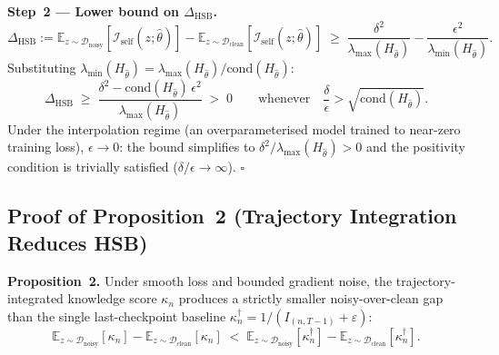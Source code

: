 \textbf{Step~2 --- Lower bound on $\Delta_\text{HSB}$.}
\begin{equation}
    \Delta_\text{HSB}
    := \mathbb{E}_{z \sim \mathcal{D}_\text{noisy}}[\mathcal{I}_\text{self}(z;\hat\theta)]
     - \mathbb{E}_{z \sim \mathcal{D}_\text{clean}}[\mathcal{I}_\text{self}(z;\hat\theta)]
    \;\geq\; \frac{\delta^2}{\lambda_{\max}(H_{\hat\theta})} - \frac{\epsilon^2}{\lambda_{\min}(H_{\hat\theta})}.
\end{equation}
Substituting $\lambda_{\min}(H_{\hat\theta}) = \lambda_{\max}(H_{\hat\theta})/\mathrm{cond}(H_{\hat\theta})$:
\begin{equation}
    \Delta_\text{HSB}
    \;\geq\; \frac{\delta^2 - \mathrm{cond}(H_{\hat\theta})\,\epsilon^2}{\lambda_{\max}(H_{\hat\theta})}
    \;>\; 0
    \qquad \text{whenever} \quad \frac{\delta}{\epsilon} > \sqrt{\mathrm{cond}(H_{\hat\theta})}.
\end{equation}
Under the interpolation regime (an overparameterised model trained to near-zero training loss), $\epsilon \to 0$: the bound simplifies to $\delta^2/\lambda_{\max}(H_{\hat\theta}) > 0$ and the positivity condition is trivially satisfied ($\delta/\epsilon \to \infty$). $\square$

\subsection{Proof of Proposition~2 (Trajectory Integration Reduces HSB)}
\label{ch5:app:proof-traj}

\textbf{Proposition~2.}
Under smooth loss and bounded gradient noise, the trajectory-integrated knowledge score $\kappa_n$ produces a strictly smaller noisy-over-clean gap than the single last-checkpoint baseline $\kappa^\dagger_n = 1/(I_{(n,T-1)} + \varepsilon)$:
\begin{equation}
    \mathbb{E}_{z \sim \mathcal{D}_\text{noisy}}[\kappa_n]
    - \mathbb{E}_{z \sim \mathcal{D}_\text{clean}}[\kappa_n]
    \;<\;
    \mathbb{E}_{z \sim \mathcal{D}_\text{noisy}}[\kappa^\dagger_n]
    - \mathbb{E}_{z \sim \mathcal{D}_\text{clean}}[\kappa^\dagger_n].
\end{equation}

